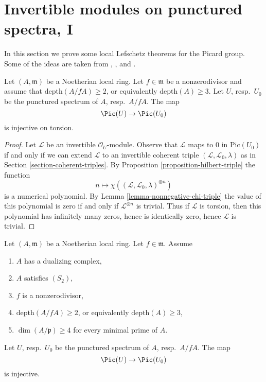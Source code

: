 \section{Invertible modules on punctured spectra, I}
\label{section-local-lefschetz-for-pic}

\noindent
In this section we prove some local Lefschetz theorems for the Picard group.
Some of the ideas are taken from
\cite{Kollar-pic}, \cite{Bhatt-local}, and \cite{Kollar-map-pic}.

\begin{lemma}
\label{lemma-injective-torsion-in-pic}
Let $(A, \mathfrak m)$ be a Noetherian local ring. Let $f \in \mathfrak m$
be a nonzerodivisor and assume that $\text{depth}(A/fA) \geq 2$, or equivalently
$\text{depth}(A) \geq 3$. Let $U$, resp.\ $U_0$ be the punctured
spectrum of $A$, resp.\ $A/fA$. The map
$$
\Pic(U) \to \Pic(U_0)
$$
is injective on torsion.
\end{lemma}

\begin{proof}
Let $\mathcal{L}$ be an invertible $\mathcal{O}_U$-module.
Observe that $\mathcal{L}$ maps to $0$ in $\text{Pic}(U_0)$
if and only if we can extend $\mathcal{L}$ to an invertible
coherent triple $(\mathcal{L}, \mathcal{L}_0, \lambda)$
as in Section \ref{section-coherent-triples}.
By Proposition \ref{proposition-hilbert-triple}
the function
$$
n \longmapsto \chi((\mathcal{L}, \mathcal{L}_0, \lambda)^{\otimes n})
$$
is a numerical polynomial. By Lemma \ref{lemma-nonnegative-chi-triple}
the value of this polynomial is zero if and only if
$\mathcal{L}^{\otimes n}$ is trivial.
Thus if $\mathcal{L}$ is torsion, then this
polynomial has infinitely many zeros, hence is
identically zero, hence $\mathcal{L}$ is trivial.
\end{proof}

\begin{proposition}[Kollar]
\label{proposition-injective-pic}
\begin{reference}
\cite[Theorem 1.9]{Kollar-map-pic}
\end{reference}
Let $(A, \mathfrak m)$ be a Noetherian local ring. Let $f \in \mathfrak m$.
Assume
\begin{enumerate}
\item $A$ has a dualizing complex,
\item $A$ satisfies $(S_2)$,
\item $f$ is a nonzerodivisor,
\item $\text{depth}(A/fA) \geq 2$, or equivalently $\text{depth}(A) \geq 3$,
\item $\dim(A/\mathfrak p) \geq 4$ for every minimal prime of $A$.
\end{enumerate}
Let $U$, resp.\ $U_0$ be the punctured spectrum of $A$, resp.\ $A/fA$. The map
$$
\Pic(U) \to \Pic(U_0)
$$
is injective.
\end{proposition}

